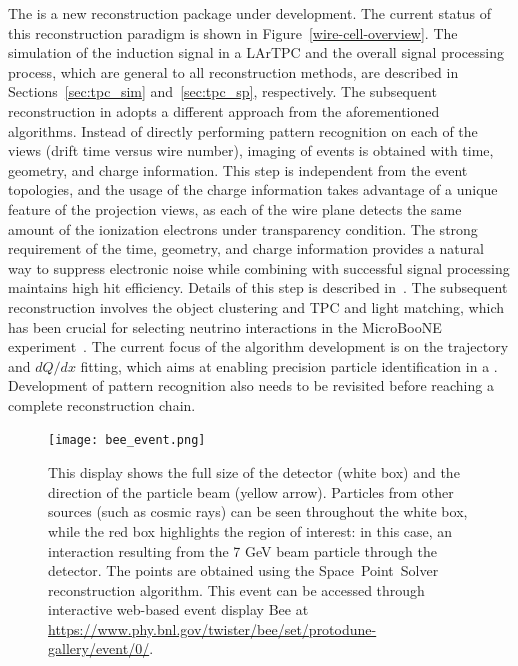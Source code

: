 The  is a new reconstruction package under development. The current 
status of this reconstruction paradigm is shown in Figure~\ref{wire-cell-overview}. The 
simulation of the induction signal in a LArTPC and the overall signal processing process,
which are general to all reconstruction methods, are described in Sections~\ref{sec:tpc_sim} 
and~\ref{sec:tpc_sp}, respectively. The subsequent reconstruction in  adopts 
a different approach from the aforementioned algorithms. Instead of directly performing pattern 
recognition on each of the \twod views (drift time versus wire number), \threed imaging of events 
is obtained with time, geometry, and charge information. This step is independent from 
the event topologies, and the usage of the charge information takes advantage of a unique 
feature of the projection views, as each of the wire plane detects the same 
amount of the ionization electrons under transparency condition. The strong requirement of the time, geometry, and charge 
information provides a natural way to suppress electronic noise
 while combining with successful signal processing maintains high hit efficiency. Details of this step is described in~\cite{Qian:2018qbv}. The subsequent reconstruction involves the object clustering and
TPC and light matching, which has been crucial for selecting neutrino interactions in the 
MicroBooNE experiment~\cite{uboone_wc_note}. The current focus of the  algorithm 
development is on the trajectory and $dQ/dx$ fitting, which aims at enabling precision particle
identification in a \lartpc. %
Development of \threed pattern recognition also needs
to be revisited before reaching a complete reconstruction chain. 


\begin{figure}[!ht]
\centering
 \texttt{[image: bee\_event.png]}
\caption{This \threed display shows the full size of the  detector (white box) and 
the direction of the particle beam (yellow arrow). Particles from other sources (such as cosmic rays) 
can be seen throughout the white box, while the red box highlights the region of interest: 
in this case, an interaction resulting from the 7 GeV beam particle through the detector. 
The \threed points are obtained using the Space~Point~Solver reconstruction algorithm. This event
can be accessed through interactive web-based event display Bee at \url{https://www.phy.bnl.gov/twister/bee/set/protodune-gallery/event/0/}.}
\label{wire-cell-bee}
\end{figure}

